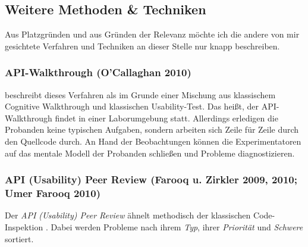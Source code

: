 \subsection{Weitere Methoden \& Techniken}

Aus Platzgründen und aus Gründen der Relevanz möchte ich die andere von mir gesichtete Verfahren und Techniken an dieser Stelle nur knapp beschreiben.

\subsubsection{API-Walkthrough (O’Callaghan 2010)}
\cite{OCallaghan:2010iv} beschreibt dieses Verfahren als im Grunde einer Mischung aus klassischem Cognitive Walkthrough und klassischen Usability-Test. Das heißt, der API-Walkthrough findet in einer Laborumgebung statt. Allerdings erledigen die Probanden keine typischen Aufgaben, sondern arbeiten sich Zeile für Zeile durch den Quellcode durch. An Hand der Beobachtungen können die Experimentatoren auf das mentale Modell der Probanden schließen und Probleme diagnostizieren.

\subsubsection{API (Usability) Peer Review (Farooq u. Zirkler 2009, 2010; Umer Farooq 2010)}
Der \textit{API (Usability) Peer Review} \citep{UmerFarooq:2010tt,SIGCHI:2009up,Farooq:2010iv} ähnelt methodisch der klassischen Code-Inspektion \citep{Kemerer:ga}. Dabei werden Probleme nach ihrem \textit{Typ}, ihrer \textit{Priorität} und \textit{Schwere} sortiert.

